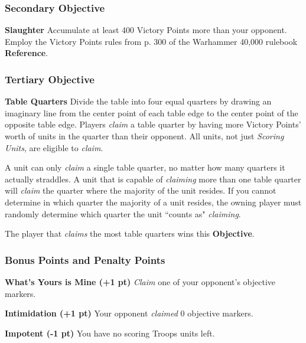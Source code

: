 \documentclass[12pt,titlepage]{article}
\newcommand{\paragraphsmall}[1]{\noindent\textbf{#1}\quad}
\begin{document}
{\vspace{-6pt}
\subsubsection*{Secondary Objective}

\paragraphsmall{Slaughter} Accumulate at least 400 Victory Points more than your opponent. Employ the Victory Points rules from p. 300 of the Warhammer 40,000 rulebook \textbf{Reference}.

\vspace{-6pt}
\subsubsection*{Tertiary Objective}

\paragraphsmall{Table Quarters} Divide the table into four equal quarters by drawing an imaginary line from the center point of each table edge to the center point of the opposite table edge. Players \textit{claim} a table quarter by having more Victory Points' worth of units in the quarter than their opponent. All units, not just \textit{Scoring Units}, are eligible to \textit{claim}.

A unit can only \textit{claim} a single table quarter, no matter how many quarters it actually straddles. A unit that is capable of \textit{claiming} more than one table quarter will \textit{claim} the quarter where the majority of the unit resides. If you cannot determine in which quarter the majority of a unit resides, the owning player must randomly determine which quarter the unit ``counts as" \textit{claiming}.

The player that \textit{claims} the most table quarters wins this \textbf{Objective}.

\vspace{-6pt}
\subsubsection*{Bonus Points and Penalty Points}

\paragraphsmall{What's Yours is Mine (+1 pt)} \textit{Claim} one of your opponent's objective markers.

\vspace{6pt}
\paragraphsmall{Intimidation (+1 pt)} Your opponent \textit{claimed} 0 objective markers.

\vspace{6pt}
\paragraphsmall{Impotent (-1 pt)} You have no scoring Troops units left.

}
\end{document}

